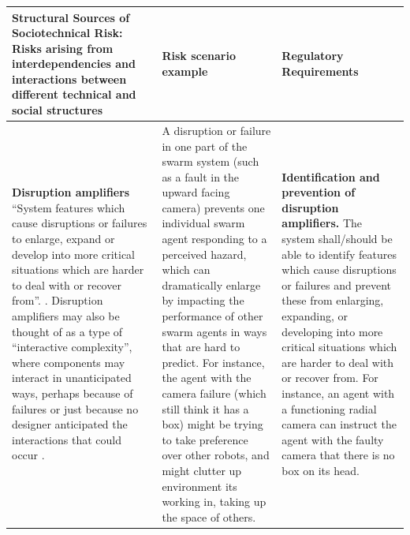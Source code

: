 \documentclass[lettersize,journal]{IEEEtran}
\begin{document}
\begin{landscape}
\begin{table}[]
    \centering
    \begin{tabular}{|p{0.3\textheight}|p{0.35\textheight}|p{0.35\textheight}|}
\hline
\textbf{Structural Sources of Sociotechnical Risk:} Risks arising from interdependencies and interactions between different technical and social structures & \textbf{Risk scenario example} & \textbf{Regulatory Requirements} \\
\hline
\textbf{Disruption amplifiers} ``System features which cause disruptions or failures to enlarge, expand or develop into more critical situations which are harder to deal with or recover from”. \cite{macrae2021learning}. Disruption amplifiers may also be thought of as a type of ``interactive complexity”, where components may interact in unanticipated ways, perhaps because of failures or just because no designer anticipated the interactions that could occur \cite{perrow1999normal}. & A disruption or failure in one part of the swarm system (such as a fault in the upward facing camera) prevents one individual swarm agent responding to a perceived hazard, which can dramatically enlarge by impacting the performance of other swarm agents in ways that are hard to predict. For instance, the agent with the camera failure (which still think it has a box) might be trying to take preference over other robots, and might clutter up environment its working in, taking up the space of others. & \textbf{Identification and prevention of disruption amplifiers.} The system shall/should be able to identify features which cause disruptions or failures and prevent these from enlarging, expanding, or developing into more critical situations which are harder to deal with or recover from. For instance, an agent with a functioning radial camera can instruct the agent with the faulty camera that there is no box on its head.\\
\hline

\end{tabular}
\end{table}
\end{landscape}
\end{document}
